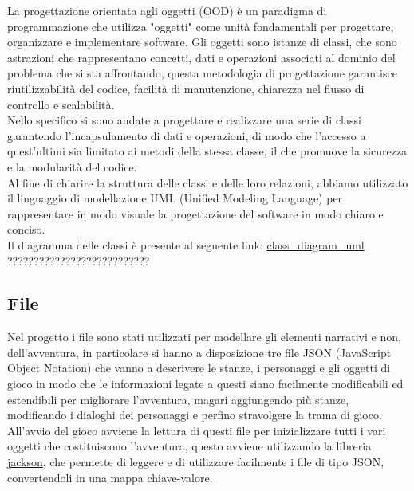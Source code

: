 \documentclass[italian,12pt,a4paper]{article}
\begin{document}
	La progettazione orientata agli oggetti (OOD) è un paradigma di programmazione che utilizza "oggetti" come unità fondamentali per progettare, organizzare e implementare software. Gli oggetti sono istanze di classi, che sono astrazioni che rappresentano concetti, dati e operazioni associati al dominio del problema che si sta affrontando, questa metodologia di progettazione garantisce riutilizzabilità del codice, facilità di manutenzione, chiarezza nel flusso di controllo e scalabilità.\\
	\linebreak
	Nello specifico si sono andate a progettare e realizzare una serie di classi garantendo l'incapsulamento di dati e operazioni, di modo che l'accesso a quest'ultimi sia limitato ai metodi della stessa classe, il che promuove la sicurezza e la modularità del codice.\\
	\linebreak
	Al fine di chiarire la struttura delle classi e delle loro relazioni, abbiamo utilizzato il linguaggio di modellazione UML (Unified Modeling Language) per rappresentare in modo visuale la progettazione del software in modo chiaro e conciso.\\
	\linebreak
	Il diagramma delle classi è presente al seguente link: \href{AGGIUNGERE LINK ALL'IMMAGINE DELL'UML}{class\_diagram\_uml}  ???????????????????????????

	
	\subsection{File}
	Nel progetto i file sono stati utilizzati per modellare gli elementi narrativi e non, dell'avventura, in particolare si hanno a disposizione tre file JSON (JavaScript Object Notation) che vanno a descrivere le stanze, i personaggi e gli oggetti di gioco in modo che le informazioni legate a questi siano facilmente modificabili ed estendibili per migliorare l'avventura, magari aggiungendo più stanze, modificando i dialoghi dei personaggi e perfino stravolgere la trama di gioco. \\
	\linebreak
	All'avvio del gioco avviene la lettura di questi file per inizializzare tutti i vari oggetti che costituiscono l'avventura, questo avviene utilizzando la libreria \href{https://github.com/FasterXML/jackson}{jackson}, che permette di leggere e di utilizzare facilmente i file di tipo JSON, convertendoli in una mappa chiave-valore.
	
\end{document}
